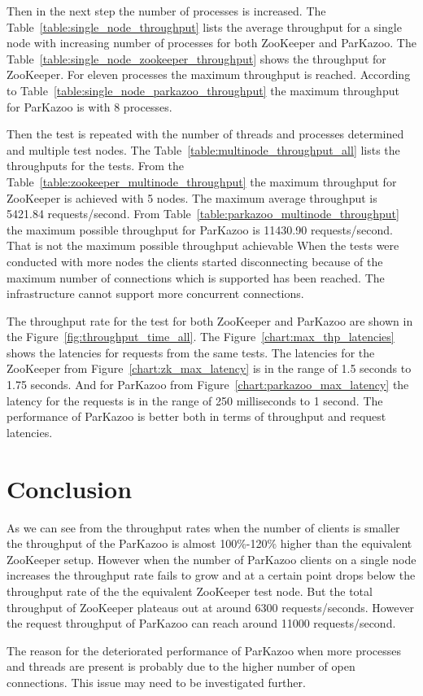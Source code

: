

Then in the next step the number of processes is increased. The Table~\ref{table:single_node_throughput} lists the average throughput for a single node with increasing number of processes for both ZooKeeper and ParKazoo. The Table~\ref{table:single_node_zookeeper_throughput} shows the throughput for ZooKeeper. For eleven processes the maximum throughput is reached. According to Table~\ref{table:single_node_parkazoo_throughput} the maximum throughput for ParKazoo is with 8 processes.

Then the test is repeated with the number of threads and processes determined and multiple test nodes. The Table~\ref{table:multinode_throughput_all} lists the throughputs for the tests. From the Table~\ref{table:zookeeper_multinode_throughput} the maximum throughput for ZooKeeper is achieved with 5 nodes. The maximum average throughput is 5421.84 requests/second. From Table~\ref{table:parkazoo_multinode_throughput} the maximum possible throughput for ParKazoo is 11430.90 requests/second. That is not the maximum possible throughput achievable When the tests were conducted with more nodes the clients started disconnecting because of the maximum number of connections which is supported has been reached. The infrastructure cannot support more concurrent connections.



The throughput rate for the test for both ZooKeeper and ParKazoo are shown in the Figure~\ref{fig:throughput_time_all}. The Figure~\ref{chart:max_thp_latencies} shows the latencies for requests from the same tests. The latencies for the ZooKeeper from Figure~\ref{chart:zk_max_latency} is in the range of 1.5 seconds to 1.75 seconds. And for ParKazoo from Figure~\ref{chart:parkazoo_max_latency} the latency for the requests is in the range of 250 milliseconds to 1 second. The performance of ParKazoo is better both in terms of throughput and request latencies.




\section{Conclusion}
As we can see from the throughput rates when the number of clients is smaller the throughput of the ParKazoo is almost 100\%-120\% higher than the equivalent ZooKeeper setup. However when the number of ParKazoo clients on a single node increases the throughput rate fails to grow and at a certain point drops below the throughput rate of the the equivalent ZooKeeper test node. But the total throughput of ZooKeeper plateaus out at around 6300 requests/seconds. However the request throughput of ParKazoo can reach around 11000 requests/second.

The reason for the deteriorated performance of ParKazoo when more processes and threads are present is probably due to the higher number of open connections. This issue may need to be investigated further. 
